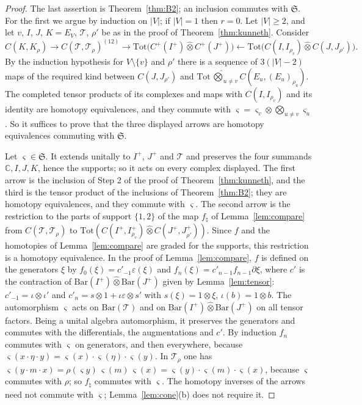 \documentclass[11pt]{amsart}
\theoremstyle{definition}
\theoremstyle{remark}
\newcommand{\C}{\mathbb C}
\begin{document}
\begin{proof}
The last assertion is Theorem~\ref{thm:B2}; an inclusion commutes with
$\mathfrak S$.  For the first we argue by induction on $|V|$; if $|V|=1$ then
$r=0$.  Let $|V|\ge2$, and let $v$, $I$, $J$, $K=E_V$, $\mathcal T$, $\rho'$ be as in
the proof of Theorem~\ref{thm:kunneth}.  Consider
\[
C(K,K_{\rho})\longrightarrow C(\mathcal T,\mathcal T_{\rho})^{(12)}
\longrightarrow\mathrm{Tot}\bigl(C^{+}(I^{+})\widehat\otimes C^{+}(J^{+})\bigr)
\longleftarrow\mathrm{Tot}\bigl(C(I,I_{\rho_v})\widehat\otimes C(J,J_{\rho'})\bigr).
\]
By the induction hypothesis for $V\setminus\{v\}$ and $\rho'$ there is a
sequence of $3(|V|-2)$ maps of the required kind between $C(J,J_{\rho'})$ and
$\mathrm{Tot}\,\widehat\bigotimes_{u\ne v}C(E_u,(E_u)_{\rho_u})$.  The
completed tensor products of its complexes and maps with
$C(I,I_{\rho_v})$ and its identity are homotopy equivalences, and they commute
with $\varsigma=\varsigma_v\otimes\bigotimes_{u\ne v}\varsigma_u$.  So it
suffices to prove that the three displayed arrows are homotopy equivalences
commuting with $\mathfrak S$.

Let $\varsigma\in\mathfrak S$.  It extends unitally to $I^{+}$, $J^{+}$ and
$\mathcal T$ and
preserves the four summands $\C,I,J,K$, hence the supports; so it acts on
every complex displayed.  The first arrow is the inclusion of Step 2 of the
proof of Theorem~\ref{thm:kunneth}, and the third is the tensor product of the
inclusions of Theorem~\ref{thm:B2}; they are homotopy equivalences, and they
commute with $\varsigma$.  The second arrow is the restriction to the parts of
support $\{1,2\}$ of the map $f_{\natural}$ of Lemma~\ref{lem:compare} from
$C(\mathcal T,\mathcal T_{\rho})$ to $\mathrm{Tot}(C(I^{+},I^{+}_{\rho_v})\widehat\otimes
C(J^{+},J^{+}_{\rho'}))$.  Since $f$ and the homotopies of
Lemma~\ref{lem:compare} are graded for the supports, this restriction is a
homotopy equivalence.  In the proof of Lemma~\ref{lem:compare}, $f$ is defined
on the generators $\xi$ by $f_0(\xi)=c'_{-1}\varepsilon(\xi)$ and
$f_n(\xi)=c'_{n-1}f_{n-1}\partial\xi$, where $c'$ is the contraction of
$\mathrm{Bar}(I^{+})\widehat\otimes\mathrm{Bar}(J^{+})$ given by
Lemma~\ref{lem:tensor}: $c'_{-1}=\iota\otimes\iota'$ and
$c'_n=s\otimes1+\iota\varepsilon\otimes s'$ with $s(\xi)=1\otimes\xi$,
$\iota(b)=1\otimes b$.  The automorphism $\varsigma$ acts on $\mathrm{Bar}(\mathcal T)$
and on $\mathrm{Bar}(I^{+})\widehat\otimes\mathrm{Bar}(J^{+})$ on all tensor
factors.  Being a unital algebra automorphism, it preserves the generators and
commutes with the differentials, the augmentations and $c'$.  By induction
$f_n$ commutes with $\varsigma$ on generators, and then everywhere, because
$\varsigma(x\cdot\eta\cdot y)=\varsigma(x)\cdot\varsigma(\eta)\cdot\varsigma(y)$.
In $\mathcal T_{\rho}$ one has $\varsigma(y\cdot m\cdot x)=\rho(\varsigma y)\,\varsigma(m)\,
\varsigma(x)=\varsigma(y)\cdot\varsigma(m)\cdot\varsigma(x)$, because $\varsigma$
commutes with $\rho$; so $f_{\natural}$ commutes with $\varsigma$.  The homotopy
inverses of the arrows need not commute with $\varsigma$;
Lemma~\ref{lem:cone}(b) does not require it.
\end{proof}
\end{document}

